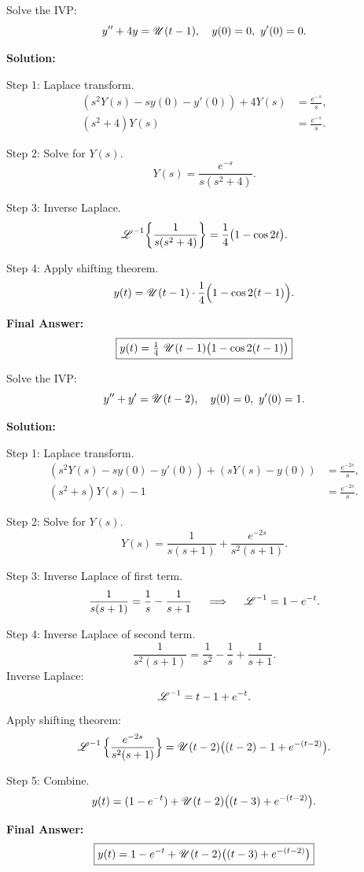     \begin{example}
      Solve the IVP:
      \[
      y'' + 4y = \operatorname{\mathscr{U}}(t-1), \quad y(0)=0,\ y'(0)=0.
      \]

      \textbf{Solution:}

      Step 1: Laplace transform.
      \begin{align*}
      (s^2 Y(s) - sy(0) - y'(0)) + 4Y(s) &= \frac{e^{-s}}{s},\\
      (s^2+4)Y(s) &= \frac{e^{-s}}{s}.
      \end{align*}

      Step 2: Solve for $Y(s)$.
      \[
      Y(s) = \frac{e^{-s}}{s(s^2+4)}.
      \]

      Step 3: Inverse Laplace.
      \[
      \operatorname{\mathscr{L}}^{-1}\!\left\{\frac{1}{s(s^2+4)}\right\} 
      = \frac{1}{4}\big(1 - \cos 2t\big).
      \]

      Step 4: Apply shifting theorem.
      \[
      y(t) = \operatorname{\mathscr{U}}(t-1)\cdot \frac{1}{4}\Big(1 - \cos 2(t-1)\Big).
      \]

      \textbf{Final Answer:}
      \[
      \boxed{y(t) = \tfrac14\, \operatorname{\mathscr{U}}(t-1)\big(1 - \cos 2(t-1)\big)}
      \]
    \end{example}


  \begin{marginfigure}
    
  \end{marginfigure}


    \begin{example}
      Solve the IVP:
      \[
      y'' + y' = \operatorname{\mathscr{U}}(t-2), \quad y(0)=0,\ y'(0)=1.
      \]

      \textbf{Solution:}

      Step 1: Laplace transform.
      \begin{align*}
      (s^2 Y(s) - sy(0) - y'(0)) + (sY(s) - y(0)) &= \frac{e^{-2s}}{s},\\
      (s^2 + s)Y(s) - 1 &= \frac{e^{-2s}}{s}.
      \end{align*}

      Step 2: Solve for $Y(s)$.
      \[
      Y(s) = \frac{1}{s(s+1)} + \frac{e^{-2s}}{s^2(s+1)}.
      \]

      Step 3: Inverse Laplace of first term.
      \[
      \frac{1}{s(s+1)} = \frac{1}{s} - \frac{1}{s+1}
      \quad \implies \quad \operatorname{\mathscr{L}}^{-1} = 1 - e^{-t}.
      \]

      Step 4: Inverse Laplace of second term.
      \[
      \frac{1}{s^2(s+1)} = \frac{1}{s^2} - \frac{1}{s} + \frac{1}{s+1}.
      \]
      Inverse Laplace:
      \[
      \operatorname{\mathscr{L}}^{-1} = t - 1 + e^{-t}.
      \]
      Apply shifting theorem:
      \[
      \operatorname{\mathscr{L}}^{-1}\Big\{\frac{e^{-2s}}{s^2(s+1)}\Big\} = \operatorname{\mathscr{U}}(t-2)\big((t-2) - 1 + e^{-(t-2)}\big).
      \]

      Step 5: Combine.
      \[
      y(t) = (1 - e^{-t}) + \operatorname{\mathscr{U}}(t-2)\big((t-3) + e^{-(t-2)}\big).
      \]

      \textbf{Final Answer:}
      \[
      \boxed{y(t) = 1 - e^{-t} + \operatorname{\mathscr{U}}(t-2)\big((t-3) + e^{-(t-2)}\big)}
      \]
    \end{example}


